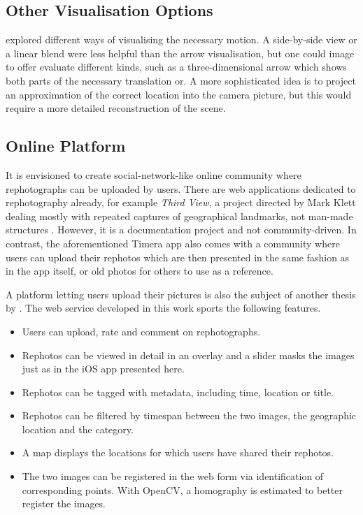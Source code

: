 \subsection*{Other Visualisation Options}\label{subsec:alternative_visualisation}

\citet{bae2010} explored different ways of visualising the necessary motion.
A side-by-side view or a linear blend were less helpful than the arrow
visualisation, but one could image to offer evaluate different kinds, such as
a three-dimensional arrow which shows both parts of the necessary translation
or. A more sophisticated idea is to project an approximation of the correct
location into the camera picture, but this would require a more detailed
reconstruction of the scene.

\subsection*{Online Platform}

It is envisioned to create social-network-like online community where
rephotographs can be uploaded by users.  There are web applications dedicated to
rephotography already, for example \emph{Third View}, a project directed by Mark
Klett dealing mostly with repeated captures of geographical landmarks, not
man-made structures \citep{thirdview}. However, it is a documentation project
and not community-driven. In contrast, the aforementioned Timera app also comes
with a community where users can upload their rephotos which are then presented
in the same fashion as in the app itself, or old photos for others to use as a
reference.

A platform letting users upload their pictures is also the subject of another
thesis by \citet{weber2015}. The web service developed in this work sports the
following features.

\begin{itemize}
   \item Users can upload, rate and comment on rephotographs.
   \item Rephotos can be viewed in detail in an overlay and a slider masks the
      images just as in the iOS app presented here.
    \item Rephotos can be tagged with metadata, including time, location or
       title.
    \item Rephotos can be filtered by timespan between the two images, the
       geographic location and the category.
    \item A map displays the locations for which users have shared their
       rephotos.
    \item The two images can be registered in the web form via identification of
       corresponding points. With OpenCV, a homography is estimated to better
       register the images.
\end{itemize}

